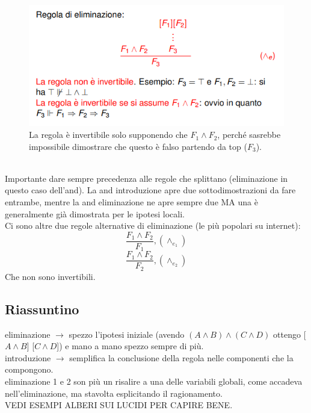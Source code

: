 \documentclass[12pt]{article}
\begin{document}
\begin{figure}[!htb]
    \centering
    \includegraphics[width=.9\linewidth,height=.40\textheight,keepaspectratio]{brutta/non_sempre_invertibile_eliminazione_and.png} %
    \begin{center}
        \caption{\label{fig:non_sempre_inv_eliminazione_and}La regola è invertibile solo supponendo che $F_1 \wedge F_2$, perché sasrebbe impossibile dimostrare che questo è falso partendo da top ($F_3$).} %
    \end{center}
\end{figure}\\
Importante dare sempre precedenza alle regole che splittano (eliminazione in questo caso dell'and). La and introduzione apre due sottodimostrazioni da fare entrambe, mentre la and eliminazione ne apre sempre due MA una è generalmente già dimostrata per le ipotesi locali.\\
Ci sono altre due regole alternative di eliminazione (le più popolari su internet):
\begin{equation}
    \dfrac{F_1 \wedge F_2}{F_1}, (\wedge_{e_1})
\end{equation}
\begin{equation}
    \dfrac{F_1 \wedge F_2}{F_2}, (\wedge_{e_2})
\end{equation}
Che non sono invertibili.
\pagebreak
\subsection{Riassuntino}
eliminazione $\rightarrow$ spezzo l'ipotesi iniziale (avendo $(A \wedge B) \wedge (C \wedge D)$ ottengo [$A \wedge B$] [$C \wedge D$]) e mano a mano spezzo sempre di più.\\
introduzione $\rightarrow$ semplifica la conclusione della regola nelle componenti che la compongono.\\
eliminazione 1 e 2 son più un risalire a una delle variabili globali, come accadeva nell'eliminazione, ma stavolta esplicitando il ragionamento.\\
VEDI ESEMPI ALBERI SUI LUCIDI PER CAPIRE BENE. 
\end{document}
